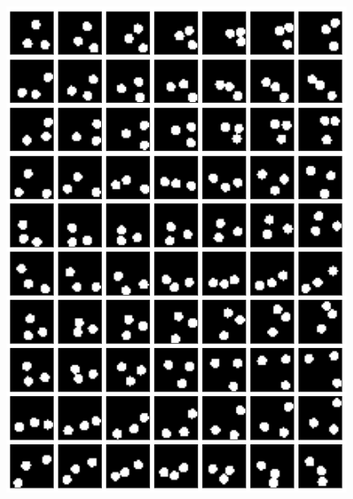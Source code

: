 \begin{frame}
\begin{figure}[h!]
\begin{minipage}{0.135\textwidth}
	\end{minipage}
	\begin{minipage}{0.33\textwidth}
		\center{}
		\includegraphics[scale=0.19]{Bilder/bouncingBalls_ODEorig2}
	\end{minipage}
	\begin{minipage}{0.33\textwidth}
		\center{}

\end{minipage}
\end{figure}
\end{frame}

